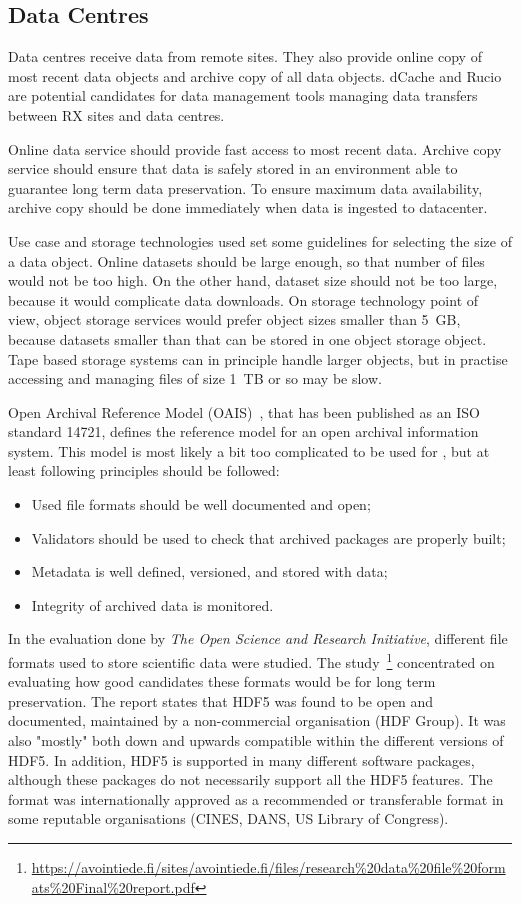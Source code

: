 \documentclass[12pt,a4paper]{article}
\begin{document}
\subsection{Data Centres}

Data centres receive data from remote sites. They also provide online copy of most recent data objects and archive copy of all data objects. 
dCache and Rucio are potential candidates for data management tools managing data transfers between RX sites and data centres. 

Online data service should provide fast access to most recent data. Archive copy service should ensure that data is safely stored in an environment able to guarantee long term data preservation.
To ensure maximum data availability, 
archive copy should be done immediately when data is ingested to datacenter. 

Use case and storage technologies used set some guidelines for selecting the size of a data object. Online datasets should be large enough, so that number of files would not be too high. On the other hand, dataset size should not be too large, because it would complicate data downloads. On storage technology point of view, object storage services would prefer object sizes smaller than 5~GB, because datasets smaller than  that can be stored in one object storage object.
Tape based storage systems can in principle handle larger objects, but in practise accessing and managing files of size 1~TB or so may be slow. 

Open Archival Reference Model (OAIS)~\cite{oais}, that has been published as an ISO standard 14721, defines the reference model for an open archival information system. This model is most likely a bit too complicated to be used
for \ED{}, but at least following principles should be followed:
\begin{itemize}
    \item Used file formats should be well documented and open;
    \item Validators should be used to check that archived packages are properly built;
    \item Metadata is well defined, versioned, and stored with data;
    \item Integrity of archived data is monitored.
\end{itemize}
In the evaluation done by \emph{The Open Science and Research Initiative}, different file formats used to store scientific data were studied. 
The study~\footnote{\url{https://avointiede.fi/sites/avointiede.fi/files/research\%20data\%20file\%20formats\%20Final\%20report.pdf}} concentrated on evaluating how good candidates these formats would be for long term preservation. 
The report states that HDF5 was found to be open and documented, maintained by a non-commercial organisation (HDF Group). 
It was also "mostly" both down and upwards compatible within the different versions of HDF5. 
In addition, HDF5 is supported in many different software packages, although these packages do not necessarily support all the HDF5 features. 
The format was internationally approved as a recommended or transferable format in some reputable organisations (CINES, DANS, US Library of Congress).
\end{document}
